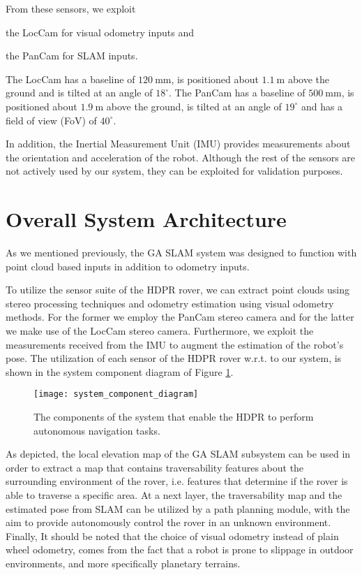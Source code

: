 From these sensors, we exploit
\begin{enumerate*}[label=(\roman*)]
    \item the LocCam for visual odometry inputs and
    \item the PanCam for SLAM inputs.
\end{enumerate*}
The LocCam has a baseline of $\SI{120}{\mm}$, is positioned about
$\SI{1.1}{\m}$ above the ground and is tilted at an angle of $18^{\circ}$.
The PanCam has a baseline of $\SI{500}{\mm}$, is positioned about
$\SI{1.9}{\m}$ above the ground, is tilted at an angle of $19^{\circ}$ and
has a field of view (FoV) of $40^{\circ}$.

In addition, the Inertial Measurement Unit (IMU) provides measurements about
the orientation and acceleration of the robot.
Although the rest of the sensors are not actively used by our system,
they can be exploited for validation purposes.


\section{Overall System Architecture}

As we mentioned previously, the GA SLAM system was designed to function
with point cloud based inputs in addition to odometry inputs.

To utilize the sensor suite of the HDPR rover, we can extract point clouds
using stereo processing techniques and odometry estimation using visual
odometry methods.
For the former we employ the PanCam stereo camera and for the latter we make
use of the LocCam stereo camera.
Furthermore, we exploit the measurements received from the IMU to augment
the estimation of the robot's pose.
The utilization of each sensor of the HDPR rover w.r.t. to our system,
is shown in the system component diagram of Figure
\ref{fig:system_component_diagram}.

\begin{figure}[h!]
    \centering
    \texttt{[image: system\_component\_diagram]}
    \decoRule
    \caption[System component diagram]{
        The components of the system that enable the HDPR to perform
        autonomous navigation tasks.
    }
    \label{fig:system_component_diagram}
\end{figure}

As depicted, the local elevation map of the GA SLAM subsystem can be used
in order to extract a map that contains traversability features about the
surrounding environment of the rover, i.e. features that determine if
the rover is able to traverse a specific area.
At a next layer, the traversability map and the estimated pose from SLAM
can be utilized by a path planning module, with the aim to provide
autonomously control the rover in an unknown environment.
Finally, It should be noted that the choice of visual odometry
instead of plain wheel odometry, comes from the fact that a robot is prone
to slippage in outdoor environments, and more specifically planetary terrains.

